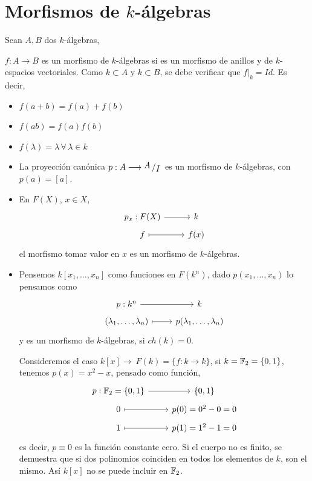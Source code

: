\section{Morfismos de $k$-\'algebras}
Sean $A, B$ dos $k$-\'algebras,
\begin{defi}
    $f: A \longrightarrow B$ es un morfismo de $k$-\'algebras si es un morfismo de anillos y de $k$-espacios vectoriales. Como $k \subset A$ y $k \subset B$, se debe verificar que $f|_k = Id$. Es decir, 
    \begin{itemize}
        \item $f(a+b) = f(a) +f(b) $
        \item $f(ab) = f(a)f(b)$
        \item $f(\lambda) = \lambda\, \forall \, \lambda \in k$ 
    \end{itemize}
    \end{defi}
    \begin{ejems}
        \begin{itemize}
            \item La proyecci\'on can\'onica $p : A \longrightarrow \modulo{A}{I}$ es un morfismo de $k$-\'algebras, con $p(a) = [a]$.
            \item En $F(X)$, $x\in X$, 
            $$ \bt p_x : F(X) \rar &  k\\[-5mm] f \rarmaps & f(x) \et$$
            el morfismo tomar valor en $x$ es un morfismo de $k$-\'algebras.
            \item Pensemos $k[x_1, \ldots, x_n]$ como funciones en $F(k^n)$, dado $p(x_1, \ldots, x_n)$ lo pensamos como 
            $$\bt p: k^n \rar & k \\[-5mm] (\lambda_1, \ldots, \lambda_n) \rarmaps & p(\lambda_1 , \ldots, \lambda_n) \et$$
            y es un morfismo de $k$-\'algebras, si $ch(k) = 0$.

            Consideremos el caso $k[x] \longrightarrow\ F(k) = \{ f: k \longrightarrow k\}$, si $k = \mathbb{F}_2 = \{0,1\}$, tenemos $p(x) = x^2-x$, pensado como funci\'on, 
            $$\bt p: \bb F_2 = \{0,1\} \rar & \{0,1\} \\[-5mm] 0 \rarmaps & p(0)=0^2-0=0 \\[-5mm] 1 \rarmaps & p(1)=1^2-1=0 \et$$
            es decir, $p \equiv 0$ es la funci\'on constante cero. Si el cuerpo no es finito, se demuestra que si dos polinomios coinciden en todos los elementos de $k$, son el mismo. As\'i $k[x]$ no se puede incluir en $\mathbb{F}_2$.
        \end{itemize}
    \end{ejems}
